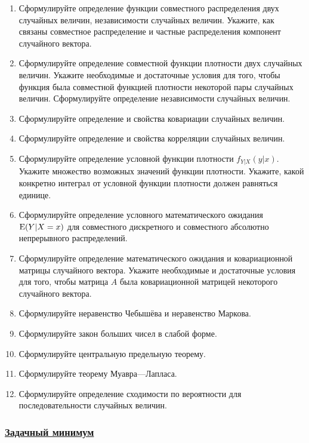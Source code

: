 \begin{enumerate}
\item Сформулируйте определение функции совместного распределения двух случайных величин, 
независимости случайных величин. 
Укажите, как связаны совместное распределение и частные распределения компонент случайного вектора.
\item Сформулируйте определение совместной функции плотности двух случайных величин.
Укажите необходимые и достаточные условия для того, чтобы  функция
была совместной функцией плотности некоторой пары случайных величин.
Сформулируйте определение независимости случайных величин.
\item Сформулируйте определение и свойства ковариации случайных величин.
\item Сформулируйте определение и свойства корреляции случайных величин.
\item Сформулируйте определение условной функции плотности $f_{Y|X}(y|x)$.
Укажите множество возможных значений функции плотности. 
Укажите, какой конкретно интеграл от условной функции плотности должен равняться единице. 
\item Сформулируйте определение условного математического ожидания $\operatorname{E}(Y|X=x)$ для совместного дискретного и совместного абсолютно непрерывного распределений.
\item Сформулируйте определение математического ожидания и ковариационной матрицы случайного
вектора. Укажите необходимые и достаточные условия для того, 
чтобы матрица $A$ была ковариационной матрицей некоторого случайного вектора.
\item Сформулируйте неравенство Чебышёва и неравенство Маркова.
\item Сформулируйте закон больших чисел в слабой форме.
\item Сформулируйте центральную предельную теорему.
\item Сформулируйте теорему Муавра—Лапласа.
\item Сформулируйте определение сходимости по вероятности для последовательности случайных величин.
\end{enumerate}

\newpage
\subsubsection*{\hyperref[sec:sol_minimum_kr_02]{Задачный минимум}}


